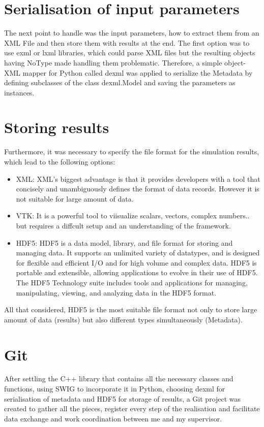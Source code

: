 \section{Serialisation of input parameters}
The next point to handle was the input parameters, how to extract them from an XML File and then store them with results at the end. The first option was to use exml or lxml libraries, which could parse XML files but the resulting objects having NoType made handling them problematic. Therefore, a simple object-XML mapper for Python called dexml was applied to serialize the Metadata by defining subclasses of the class dexml.Model and saving the parameters as instances.\\
\section{Storing results}
Furthermore, it was necessary to specify the file format for the simulation results, which lead to the following options:\\
\begin{itemize}
\item XML: XML's biggest advantage is that it provides developers with a tool that concisely and unambiguously defines the format of data records. However it is not suitable for large amount of data.\\
\item VTK: It is a powerful tool to viisualize scalars, vectors, complex numbers.. but  requires a diffcult setup and an understanding of the framework.\\ 
\item HDF5: HDF5 is a data model, library, and file format for storing and managing data. It supports an unlimited variety of datatypes, and is designed for flexible and efficient I/O and for high volume and complex data. HDF5 is portable and extensible, allowing applications to evolve in their use of HDF5. The HDF5 Technology suite includes tools and applications for managing, manipulating, viewing, and analyzing data in the HDF5 format. \\ 
\end{itemize}
All that considered, HDF5 is the most suitable file format not only to store large amount of data (results) but also different types simultaneously (Metadata).
\section{Git}
After settling the C++ library that contains all the necessary classes and functions, using SWIG to incorporate it in Python, choosing dexml for serialisation of metadata and HDF5 for storage of results, a Git project was created to gather all the pieces, register every step of the realisation and facilitate data exchange and work coordination between me and my supervisor. \\
